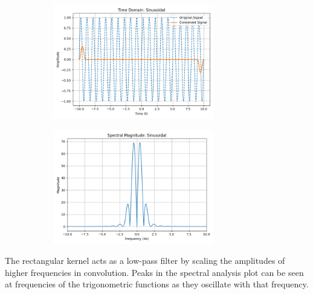 \documentclass[a4paper,12pt]{article}
\begin{document}
\begin{figure}[H]
    \centering
    \begin{subfigure}{0.5\textwidth}
        \centering
        \includegraphics[height=5cm]{figs/Analysis0.png}
    \end{subfigure}%
    \begin{subfigure}{0.5\textwidth}
        \centering
        \includegraphics[height=5cm]{figs/Analysis1.png}
    \end{subfigure}
\end{figure}

The rectangular kernel acts as a low-pass filter by scaling the amplitudes of higher frequencies in convolution. Peaks in the spectral analysis plot can be seen at frequencies of the trigonometric functions as they oscillate with that frequency.
\end{document}
